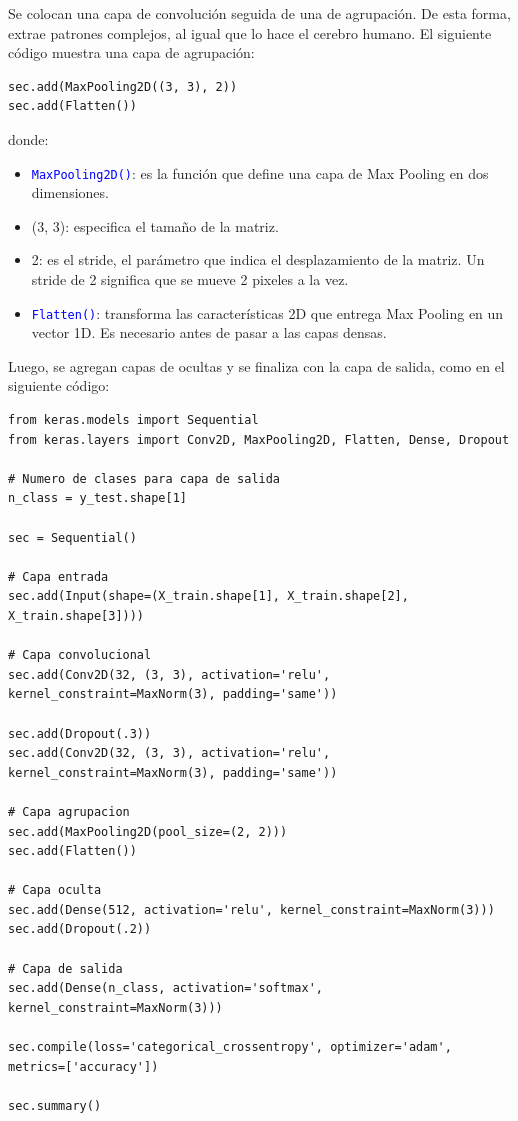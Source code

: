 \documentclass[a4paper, 12pt]{book}
\begin{document}
Se colocan una capa de convolución seguida de una de agrupación. De esta forma, extrae patrones complejos, al igual que lo hace el cerebro humano. El siguiente código muestra una capa de agrupación:
\begin{verbatim}
sec.add(MaxPooling2D((3, 3), 2))
sec.add(Flatten())
\end{verbatim}
donde:
\begin{itemize}
	\item \texttt{\textcolor{blue}{MaxPooling2D()}}: es la función que define una capa de Max Pooling en dos dimensiones.
	\item (3, 3): especifica el tamaño de la matriz.
	\item 2: es el stride, el parámetro que indica el desplazamiento de la matriz. Un stride de 2 significa que se mueve 2 pixeles a la vez.
	\item \texttt{\textcolor{blue}{Flatten()}}: transforma las características 2D que entrega Max Pooling en un vector 1D. Es necesario antes de pasar a las capas densas.
\end{itemize}
Luego, se agregan capas de ocultas y se finaliza con la capa de salida, como en el siguiente código:
\begin{verbatim}
from keras.models import Sequential
from keras.layers import Conv2D, MaxPooling2D, Flatten, Dense, Dropout

# Numero de clases para capa de salida
n_class = y_test.shape[1]

sec = Sequential()

# Capa entrada
sec.add(Input(shape=(X_train.shape[1], X_train.shape[2], X_train.shape[3])))

# Capa convolucional
sec.add(Conv2D(32, (3, 3), activation='relu', kernel_constraint=MaxNorm(3), padding='same'))

sec.add(Dropout(.3))
sec.add(Conv2D(32, (3, 3), activation='relu', kernel_constraint=MaxNorm(3), padding='same'))

# Capa agrupacion
sec.add(MaxPooling2D(pool_size=(2, 2)))
sec.add(Flatten())

# Capa oculta
sec.add(Dense(512, activation='relu', kernel_constraint=MaxNorm(3)))
sec.add(Dropout(.2))

# Capa de salida
sec.add(Dense(n_class, activation='softmax', kernel_constraint=MaxNorm(3)))

sec.compile(loss='categorical_crossentropy', optimizer='adam', metrics=['accuracy'])

sec.summary()
\end{verbatim}
\end{document}
